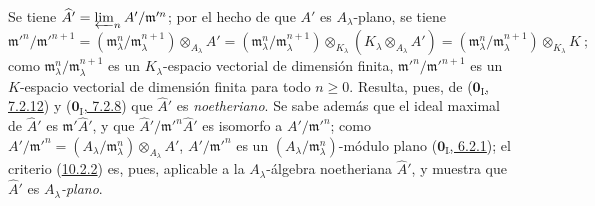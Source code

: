 \documentclass[10pt,oneside,openany]{book}
\theoremstyle{egaenv}\newtheorem*{env}{---}
\theoremstyle{egastatement}
\theoremstyle{egadescription}
\renewcommand{\geq}{\geqslant}
\begin{document}
Se tiene $\widehat A'=\varprojlim_n A'/\mathfrak m'^{n}$;
por el hecho de que $A'$ es $A_\lambda$-plano, se tiene
\[
  \mathfrak m'^{n}/\mathfrak m'^{n+1}
  =(\mathfrak m_\lambda^n/\mathfrak m_\lambda^{n+1})
    \otimes_{A_\lambda}A'
  =(\mathfrak m_\lambda^n/\mathfrak m_\lambda^{n+1})
    \otimes_{K_\lambda}(K_\lambda\otimes_{A_\lambda}A')
  =(\mathfrak m_\lambda^n/\mathfrak m_\lambda^{n+1})
    \otimes_{K_\lambda}K~;
\]
como $\mathfrak m_\lambda^n/\mathfrak m_\lambda^{n+1}$ es un $K_\lambda$-espacio vectorial de dimensión finita, $\mathfrak m'^{n}/\mathfrak m'^{n+1}$ es un $K$-espacio vectorial de dimensión finita para todo $n\geq0$. Resulta, pues, de (\hyperref[0.7.2.12-fr]{$\mathbf{0}_{\mathrm I}$, 7.2.12}) y (\hyperref[0.7.2.8-fr]{$\mathbf{0}_{\mathrm I}$, 7.2.8}) que $\widehat A'$ es \emph{noetheriano}.
Se sabe además que el ideal maximal de $\widehat A'$ es $\mathfrak m'\widehat A'$, y que $\widehat A'/\mathfrak m'^{n}\widehat A'$ es isomorfo a $A'/\mathfrak m'^{n}$;
como $A'/\mathfrak m'^{n}=(A_\lambda/\mathfrak m_\lambda^n)
\otimes_{A_\lambda}A'$,
$A'/\mathfrak m'^{n}$ es un $(A_\lambda/\mathfrak m_\lambda^n)$-módulo plano (\hyperref[0.6.2.1-fr]{$\mathbf{0}_{\mathrm I}$, 6.2.1}); el criterio (\hyperref[0.10.2.2-fr]{10.2.2}) es, pues, aplicable a la $A_\lambda$-álgebra noetheriana $\widehat A'$, y muestra que $\widehat A'$ es \emph{$A_\lambda$-plano}.
\end{document}
